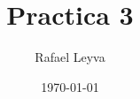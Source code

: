\documentclass{report}
\title{Practica 3}
\author{Rafael Leyva}
\date{\today}
\begin{document}
\newpage

\maketitle

\newpage

\renewcommand{\contentsname}{Indice de contenidos}
\tableofcontents







%



\end{document}
